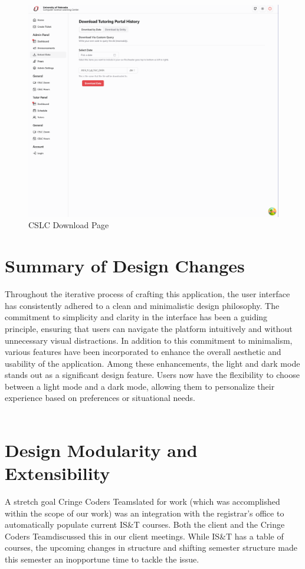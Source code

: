 \documentclass[oneside,openany,obeyspaces]{book}
\newcommand\tab[1][1cm]{\hspace*{#1}}
\newcommand\TeamName{Cringe Coders Team}
\begin{document}
\begin{flushleft}
    \begin{figure}
        \centering
        \includegraphics[width=0.75\linewidth]{img/Download.png}
        \caption{CSLC Download Page}
        \label{fig:Download Page}
    \end{figure}



    \section{Summary of Design Changes}

    \tab Throughout the iterative process of crafting this application, the user interface has consistently adhered to a clean and minimalistic design philosophy. The commitment to simplicity and clarity in the interface has been a guiding principle, ensuring that users can navigate the platform intuitively and without unnecessary visual distractions. In addition to this commitment to minimalism, various features have been incorporated to enhance the overall aesthetic and usability of the application. Among these enhancements, the light and dark mode stands out as a significant design feature. Users now have the flexibility to choose between a light mode and a dark mode, allowing them to personalize their experience based on preferences or situational needs.\\~\\


    \section{Design Modularity and Extensibility}

    \tab A stretch goal \TeamName slated for work (which was accomplished within the scope of our work) was an integration with the registrar's office to automatically populate current IS\&T courses. Both the client and the \TeamName\space discussed this in our client meetings. While IS\&T has a table of courses, the upcoming changes in structure and shifting semester structure made this semester an inopportune time to tackle the issue.\\~\\


\end{flushleft}
\end{document}
